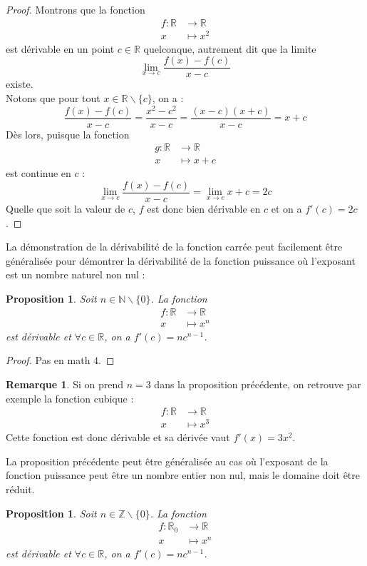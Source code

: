\documentclass[a4paper,fontsize=13pt]{scrreprt}
\theoremstyle{plain}
\newtheorem{pro}[subsection]{Proposition}
\theoremstyle{definition}
\newtheorem{rema}[subsection]{Remarque}
\newcommand{\nn}{\mathbb{N}}
\newcommand{\zz}{\mathbb{Z}}
\newcommand{\rr}{\mathbb{R}}
\begin{document}
\begin{proof}
	Montrons que la fonction
	\begin{align*}
	f : \rr &\to \rr \\
	x &\mapsto x^2
	\end{align*}
	est dérivable en un point $c \in \rr$ quelconque, autrement dit que la limite
	$$\lim\limits_{x \to c} \frac{f(x)-f(c)}{x-c}$$
	existe. \\
	Notons que pour tout $x \in \rr \backslash \{c\}$, on a :
	$$\frac{f(x)-f(c)}{x-c} = \frac{x^2-c^2}{x-c} = \frac{(x-c)(x+c)}{x-c} = x+c$$
	Dès lors, puisque la fonction
	\begin{align*}
	g : \rr &\to \rr \\
	x &\mapsto x+c
	\end{align*}
	est continue en $c$ :
	$$\lim\limits_{x \to c} \frac{f(x)-f(c)}{x-c} = \lim\limits_{x \to c} x+c = 2c$$
	Quelle que soit la valeur de $c$, $f$ est donc bien dérivable en $c$ et on a $f'(c)=2c$.
\end{proof}
La démonstration de la dérivabilité de la fonction carrée peut facilement être généralisée pour démontrer la dérivabilité de la fonction puissance où l'exposant est un nombre naturel non nul :
\begin{pro}
	Soit $n \in \nn \backslash \{0\}$. La fonction
	\begin{align*}
	f : \rr &\to \rr \\
	x &\mapsto x^n
	\end{align*}
	est dérivable et $\forall c \in \rr$, on a $f'(c) = nc^{n-1}$.
\end{pro}
\begin{proof}
	Pas en math $4$.
\end{proof}
\begin{rema}
	Si on prend $n =3$ dans la proposition précédente, on retrouve par exemple la fonction cubique :
	\begin{align*}
	f : \rr &\to \rr \\
	x &\mapsto x^3
	\end{align*}
	Cette fonction est donc dérivable et sa dérivée vaut $f'(x)=3x^2$.
\end{rema}
La proposition précédente peut être généralisée au cas où l'exposant de la fonction puissance peut être un nombre entier non nul, mais le domaine doit être réduit.
\begin{pro}
	Soit $n \in \zz \backslash \{0\}$. La fonction
	\begin{align*}
	f : {\rr}_{0} &\to \rr \\
	x &\mapsto x^n
	\end{align*}
	est dérivable et $\forall c \in \rr$, on a $f'(c) = nc^{n-1}$.
\end{pro}
\end{document}
